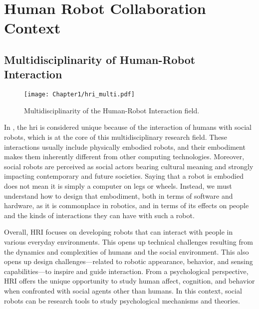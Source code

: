 \ifdefined{}
\else
\setcounter{chapter}{0}
\dominitoc
\faketableofcontents
\fi

\chapter{Human Robot Collaboration Context}
\label{chap:1}
\minitoc


\section{Multidisciplinarity of Human-Robot Interaction}

\begin{figure}
    \center
    \texttt{[image: Chapter1/hri\_multi.pdf]}
    \caption{Multidisciplinarity of the Human-Robot Interaction field.}
    \label{fig:hri_multi}
\end{figure}

In \cite{bartneck_human_robot_2020}, the \acrfull{hri} is considered unique because of the interaction of humans with social robots, which is at the core of this multidisciplinary research field. These interactions usually include physically embodied robots, and their embodiment makes them inherently different from other computing technologies. Moreover, social robots are perceived as social actors bearing cultural meaning and strongly impacting contemporary and future societies. Saying that a robot is embodied does not mean it is simply a computer on legs or wheels. Instead, we must understand how to design that embodiment, both in terms of software and hardware, as it is commonplace in robotics, and in terms of its effects on people and the kinds of interactions they can have with such a robot.

Overall, HRI focuses on developing robots that can interact with people in various everyday environments. This opens up technical challenges resulting from the dynamics and complexities of humans and the social environment. This also opens up design challenges—related to robotic appearance, behavior, and sensing capabilities—to inspire and guide interaction. From a psychological perspective, HRI offers the unique opportunity to study human affect, cognition, and behavior when confronted with social agents other than humans. In this context, social robots can be research tools to study psychological mechanisms and theories.

